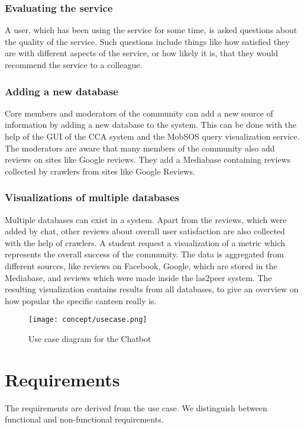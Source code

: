 \subsubsection{Evaluating the service} A user, which has been using the service for some time, is asked questions about the quality of the service. Such questions include things like how satisfied they are with different aspects of the service, or how likely it is, that they would recommend the service to a colleague.

\subsubsection{Adding a new database} Core members and moderators of the community can add a new source of information by adding a new database to the system. This can be done with the help of the GUI of the CCA system and the MobSOS query visualization service.
The moderators are aware that many members of the community also add reviews on sites like Google reviews. 
They add a Mediabase containing reviews collected by crawlers from sites like Google Reviews.

\subsubsection{Visualizations of multiple databases} Multiple databases can exist in a system. Apart from the reviews, which were added by chat, other reviews about overall user satisfaction are also collected with the help of crawlers. A student request a visualization of a metric which represents the overall success of the community.
The data is aggregated from different sources, like reviews on Facebook, Google, which are stored in the Mediabase, and reviews which were made inside the las2peer system. 
The resulting visualization contains results from all databases, to give an overview on how popular the specific canteen really is.

\begin{figure}
    \centering
    \texttt{[image: concept/usecase.png]}
    \caption{Use case diagram for the Chatbot}
\end{figure}

\section{Requirements}
The requirements are derived from the use case. We distinguish between functional and non-functional requirements.
